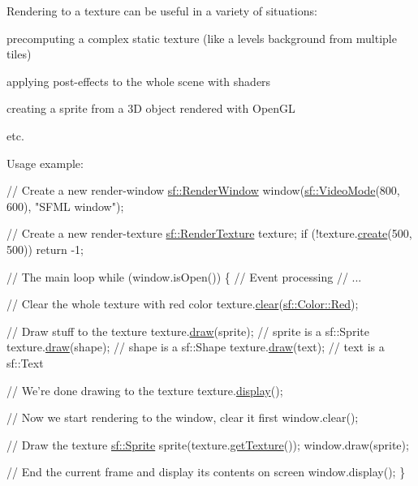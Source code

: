 Rendering to a texture can be useful in a variety of situations\+: \begin{DoxyItemize}
\item precomputing a complex static texture (like a level\textquotesingle{}s background from multiple tiles) \item applying post-\/effects to the whole scene with shaders \item creating a sprite from a 3D object rendered with Open\+GL \item etc.\end{DoxyItemize}
Usage example\+:


\begin{DoxyCode}
\textcolor{comment}{// Create a new render-window}
\hyperlink{classsf_1_1_render_window}{sf::RenderWindow} window(\hyperlink{classsf_1_1_video_mode}{sf::VideoMode}(800, 600), \textcolor{stringliteral}{"SFML window"});

\textcolor{comment}{// Create a new render-texture}
\hyperlink{classsf_1_1_render_texture}{sf::RenderTexture} texture;
\textcolor{keywordflow}{if} (!texture.\hyperlink{classsf_1_1_render_texture_aefbb76eb3b87e368ab974b2660931ccb}{create}(500, 500))
    \textcolor{keywordflow}{return} -1;

\textcolor{comment}{// The main loop}
\textcolor{keywordflow}{while} (window.isOpen())
\{
   \textcolor{comment}{// Event processing}
   \textcolor{comment}{// ...}

   \textcolor{comment}{// Clear the whole texture with red color}
   texture.\hyperlink{classsf_1_1_render_target_a6bb6f0ba348f2b1e2f46114aeaf60f26}{clear}(\hyperlink{classsf_1_1_color_a127dbf55db9c07d0fa8f4bfcbb97594a}{sf::Color::Red});

   \textcolor{comment}{// Draw stuff to the texture}
   texture.\hyperlink{classsf_1_1_render_target_a12417a3bcc245c41d957b29583556f39}{draw}(sprite);  \textcolor{comment}{// sprite is a sf::Sprite}
   texture.\hyperlink{classsf_1_1_render_target_a12417a3bcc245c41d957b29583556f39}{draw}(shape);   \textcolor{comment}{// shape is a sf::Shape}
   texture.\hyperlink{classsf_1_1_render_target_a12417a3bcc245c41d957b29583556f39}{draw}(text);    \textcolor{comment}{// text is a sf::Text}

   \textcolor{comment}{// We're done drawing to the texture}
   texture.\hyperlink{classsf_1_1_render_texture_af92886d5faef3916caff9fa9ab32c555}{display}();

   \textcolor{comment}{// Now we start rendering to the window, clear it first}
   window.clear();

   \textcolor{comment}{// Draw the texture}
   \hyperlink{classsf_1_1_sprite}{sf::Sprite} sprite(texture.\hyperlink{classsf_1_1_render_texture_a07ecea85f05932fa02a8279416721bc9}{getTexture}());
   window.draw(sprite);

   \textcolor{comment}{// End the current frame and display its contents on screen}
   window.display();
\}
\end{DoxyCode}


